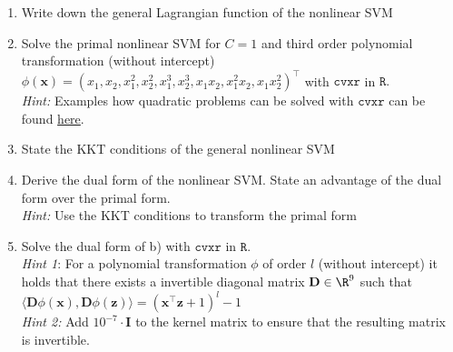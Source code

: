 \begin{enumerate}
\item Write down the general Lagrangian function of the nonlinear SVM
\item Solve the primal nonlinear SVM for $C=1$ and third order polynomial transformation (without intercept) $\phi(\mathbf{x}) = (x_1, x_2, x_1^2, x_2^2, x_1^3, x_2^3, x_1x_2, x_1^2x_2, x_1x_2^2)^\top$ with $\texttt{cvxr}$ in $\texttt{R}.$ \\
\textit{Hint:} Examples how quadratic problems can be solved with $\texttt{cvxr}$ can be found \href{http://www.di.fc.ul.pt/~jpn/r/optimization/CVXR.html#quadratic-programming}{here}.
\item State the KKT conditions of the general nonlinear SVM
\item Derive the dual form of the nonlinear SVM. State an advantage of the dual form over the primal form. \\
\textit{Hint:} Use the KKT conditions to transform the primal form
\item Solve the dual form of b) with $\texttt{cvxr}$ in $\texttt{R}.$ \\
\textit{Hint 1}: For a polynomial transformation $\phi$ of order $l$ (without intercept) it holds that there exists a invertible diagonal matrix $\mathbf{D} \in \R^9$ such that $\langle \mathbf{D}\phi(\mathbf{x}), \mathbf{D}\phi(\mathbf{z})\rangle = (\mathbf{x}^\top\mathbf{z} + 1)^l - 1$ \\
\textit{Hint 2:} Add $10^{-7} \cdot \mathbf{I}$ to the kernel matrix to ensure that the resulting matrix is invertible. \\


\end{enumerate}
